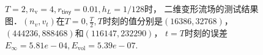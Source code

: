 \begin{figure}[htbp]
  \hfill
  \hfill
	\caption[二维变形流场测试结果]{$T=2,n_{\mathrm{v}}=4,r_{\mathsf{tiny}}=0.01,h_L=1/128$时，
		二维变形流场的测试结果图．$(n_v,v_t)$在$T=0, \frac{T}{2}, T$时刻的值分别是$(16386,32768)$，$(444236,888468)$和$(116147,232290)$，
		$t=T$时刻的误差$E_{\infty}=5.81e-04,E_{\mathrm{vol}}=5.39e-07$.}
	\label{fig:deformation}
\end{figure}


